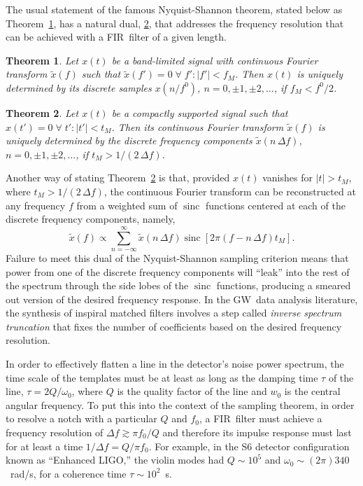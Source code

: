 \documentclass[preprint2]{aastex}
\newtheorem{thm}{Theorem}
\newcommand{\GW}{GW}%
\newcommand{\fir}{FIR}%
\DeclareMathOperator{\sinc}{sinc}
\begin{document}
The usual statement of the famous Nyquist-Shannon theorem, stated below as Theorem~\ref{thm:nyquist}, has a natural dual, \ref{thm:nyquist-dual}, that addresses the frequency resolution that can be achieved with a \fir\ filter of a given length.

\begin{thm}
	\label{thm:nyquist}
	\citep[after][p. 518]{oppenheim1997signals}
	Let $x(t)$ be a band-limited signal with continuous Fourier transform $\tilde{x}(f)$ such that $\tilde{x}(f') = 0 \; \forall \; f' : |f'| < f_M$.  Then $x(t)$ is uniquely determined by its discrete samples $x(n/f^0)$, $n = 0, \pm 1, \pm 2, \dots$, if $f_M < f^0 / 2$.
\end{thm}

\begin{thm}
	\label{thm:nyquist-dual}
	Let $x(t)$ be a compactly supported signal such that $x(t') = 0 \; \forall \; t' : |t'| < t_M$.  Then its continuous Fourier transform $\tilde{x}(f)$ is uniquely determined by the discrete frequency components $\tilde{x}(n \, \Delta f)$, $n = 0, \pm 1, \pm 2, \dots$, if $t_M > 1 / (2 \, \Delta f)$.
\end{thm}

Another way of stating Theorem~\ref{thm:nyquist-dual} is that, provided $x(t)$ vanishes for $|t| > t_M$, where $t_M > 1 / (2 \, \Delta f)$, the continuous Fourier transform can be reconstructed at any frequency $f$ from a weighted sum of $\sinc$ functions centered at each of the discrete frequency components, namely,
$$
	\tilde{x}(f) \propto \sum_{n=-\infty}^{\infty} \tilde{x}\left(n \, \Delta f\right) \sinc \left[ 2 \pi (f - n \, \Delta f) t_M \right].
$$
Failure to meet this dual of the Nyquist-Shannon sampling criterion means that power from one of the discrete frequency components will ``leak'' into the rest of the spectrum through the side lobes of the $\sinc$ functions, producing a smeared out version of the desired frequency response.  In the \GW\ data analysis literature, the synthesis of inspiral matched filters involves a step called \emph{inverse spectrum truncation} \citep[see][section VII]{findchirppaper} that fixes the number of coefficients based on the desired frequency resolution.

In order to effectively flatten a line in the detector's noise power
spectrum, the time scale of the templates must be at least as long as
the damping time $\tau$ of the line, $\tau = 2 Q / \omega_0$, where $Q$ is the quality
factor of the line and $w_0$ is the central angular frequency.  To put this into the context of the sampling theorem, in order to resolve a notch with a particular $Q$ and $f_0$, a \fir\ filter must achieve a frequency resolution of $\Delta f \gtrsim \pi f_0 / Q$ and therefore its impulse response must last for at least a time $1/\Delta f = Q / \pi f_0$.  For example,
in the S6 detector configuration known as ``Enhanced LIGO,'' the violin modes \citep{ELIGOSusp} had $Q \sim 10^5$ and $\omega_0 \sim (2 \pi) 340$~rad/s, for a coherence time $\tau \sim 10^2$~s.
\end{document}
